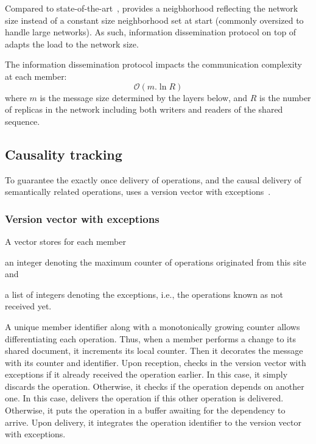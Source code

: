 Compared to state-of-the-art~\cite{ganesh2003peer, jelasity2007gossip,
  voulgaris2005cyclon}, \SPRAY provides a neigbhorhood reflecting the network
size instead of a constant size neighborhood set at start (commonly oversized to
handle large networks). As such, information dissemination protocol on top of
\SPRAY adapts the load to the network size.

The information dissemination protocol impacts the communication complexity at
each member:
\begin{equation}
  \mathcal{O}(m.\ln R)
\end{equation}
where $m$ is the message size determined by the layers below, and
$R$ is the number of replicas in the network including both
writers and readers of the shared sequence.


\subsection{Causality tracking}
\label{subsec:causality}

To guarantee the exactly once delivery of operations, and the causal delivery of
semantically related operations, \CRATE uses a version vector with
exceptions~\cite{malkhi2007concise, mukund2014optimized}.

\subsubsection{Version vector with exceptions}

A vector stores for each member
\begin{inparaenum}[(i)]
\item an integer denoting the maximum counter of operations originated from
  this site and
\item a list of integers denoting the exceptions, i.e., the operations known
  as not received yet.
\end{inparaenum}

A unique member identifier along with a monotonically growing counter allows
differentiating each operation. Thus, when a member performs a change to its
shared document, it increments its local counter. Then it decorates the message
with its counter and identifier. Upon reception, \CRATE checks in the version
vector with exceptions if it already received the operation earlier. In this
case, it simply discards the operation.  Otherwise, it checks if the operation
depends on another one. In this case, \CRATE delivers the operation if this
other operation is delivered. Otherwise, it puts the operation in a buffer
awaiting for the dependency to arrive. Upon delivery, it integrates the
operation identifier to the version vector with exceptions.

